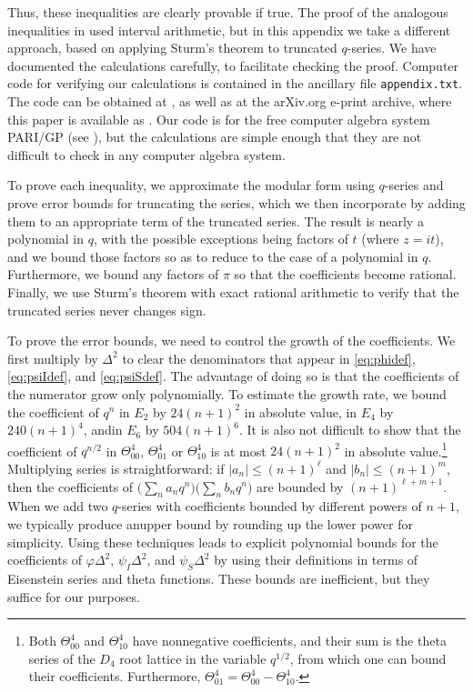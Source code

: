 \documentclass{aomart}
\theoremstyle{plain}
\numberwithin{theorem}{section}
\numberwithin{equation}{section}
\begin{document}
Thus, these inequalities are clearly provable if true. The proof of the
analogous inequalities in \cite{V} used interval arithmetic, but in this
appendix we take a different approach, based on applying Sturm's theorem to
truncated $q$-series. We have documented the calculations carefully, to
facilitate checking the proof. Computer code for verifying our calculations
is contained in the ancillary file \texttt{appendix.txt}.  The code can be
obtained at , as well as at the arXiv.org
e-print archive, where this paper is available as .  Our
code is for the free computer algebra system PARI/GP (see \cite{PARI}), but
the calculations are simple enough that they are not difficult to check in
any computer algebra system.

To prove each inequality, we approximate the modular form using $q$-series
and prove error bounds for truncating the series, which we then incorporate
by adding them to an appropriate term of the truncated series. The result is
nearly a polynomial in $q$, with the possible exceptions being factors of $t$
(where $z=it$), and we bound those factors so as to reduce to the case of a
polynomial in $q$. Furthermore, we bound any factors of $\pi$ so that the
coefficients become rational. Finally, we use Sturm's theorem with exact
rational arithmetic to verify that the truncated series never changes sign.

To prove the error bounds, we need to control the growth of the coefficients.
We first multiply by $\Delta^2$ to clear the denominators that appear in
\eqref{eq:phidef}, \eqref{eq:psiIdef}, and \eqref{eq:psiSdef}. The advantage
of doing so is that the coefficients of the numerator grow only polynomially.
To estimate the growth rate, we bound the coefficient of $q^n$ in $E_2$ by
$24(n+1)^2$ in absolute value, in $E_4$ by $240(n+1)^4$, and\break in $E_6$
by $504(n+1)^6$.  It is also not difficult to show that the coefficient of
$q^{n/2}$ in $\Theta_{00}^4$, $\Theta_{01}^4$ or $\Theta_{10}^4$ is at most
$24(n+1)^2$ in absolute value.\footnote{Both $\Theta_{00}^4$ and
$\Theta_{10}^4$ have nonnegative coefficients, and their sum is the theta
series of the $D_4$ root lattice in the variable $q^{1/2}$, from which one
can bound their coefficients. Furthermore, $\Theta_{01}^4 = \Theta_{00}^4 -
\Theta_{10}^4$.} Multiplying series is straightforward: if $|a_n| \le
(n+1)^\ell$ and $|b_n| \le (n+1)^m$, then the coefficients of\break
$\big(\sum_n a_n q^n\big)\big(\sum_n b_n q^n\big)$ are bounded by
$(n+1)^{\ell+m+1}$. When we add two $q$-series with coefficients bounded by
different powers of $n+1$, we typically produce an\break upper bound by
rounding up the lower power for simplicity. Using these tech\-niques leads to
explicit polynomial bounds for the coefficients of $\varphi\Delta^2$, $\psi_I
\Delta^2$, and $\psi_S \Delta^2$ by using their definitions in terms of
Eisenstein series and theta functions. These bounds are inefficient, but they
suffice for our purposes.
\end{document}
